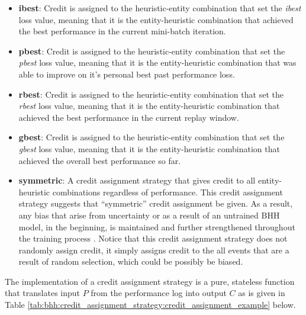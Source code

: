 \begin{itemize}
    \item \textbf{ibest}: Credit is assigned to the heuristic-entity combination that set the \textit{ibest} loss value, meaning that it is the entity-heuristic combination that achieved the best performance in the current mini-batch iteration.
    
    \item \textbf{pbest}: Credit is assigned to the heuristic-entity combination that set the \textit{pbest} loss value, meaning that it is the entity-heuristic combination that was able to improve on it's personal best past performance loss.
    
    \item \textbf{rbest}: Credit is assigned to the heuristic-entity combination that set the \textit{rbest} loss value, meaning that it is the entity-heuristic combination that achieved the best performance in the current replay window.
    
    \item \textbf{gbest}: Credit is assigned to the heuristic-entity combination that set the \textit{gbest} loss value, meaning that it is the entity-heuristic combination that achieved the overall best performance so far.
    
    \item \textbf{symmetric}: A credit assignment strategy that gives credit to all entity-heuristic combinations regardless of performance. This credit assignment strategy suggests that ``symmetric'' credit assignment be given. As a result, any bias that arise from uncertainty or as a result of an untrained \ac{BHH} model, in the beginning, is maintained and further strengthened throughout the training process . Notice that this credit assignment strategy does not randomly assign credit, it simply assigns credit to the all events that are a result of random selection, which could be possibly be biased.
\end{itemize}

The implementation of a credit assignment strategy is a pure, stateless function that translates input $P$ from the performance log into output $C$ as is given in Table \ref{tab:bhh:credit_assignment_strategy:credit_assignment_example} below.


